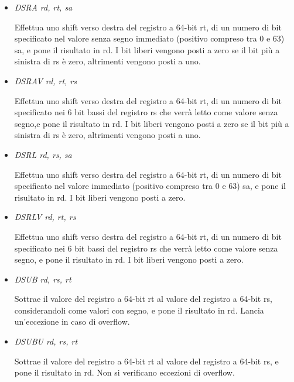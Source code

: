 \documentclass[letterpaper,10pt,english]{sphinxmanual}
\begin{document}
\begin{itemize}
\item {} 
\emph{DSRA rd, rt, sa}

Effettua uno shift verso destra del registro a 64-bit rt, di un numero di
bit specificato nel valore senza segno immediato (positivo compreso tra 0 e
63) sa, e pone il risultato in rd. I bit liberi vengono posti a zero se il
bit più a sinistra di rs è zero, altrimenti vengono posti a uno.

\item {} 
\emph{DSRAV rd, rt, rs}

Effettua uno shift verso destra del registro a 64-bit rt, di un numero di
bit specificato nei 6 bit bassi del registro rs che verrà letto come valore
senza segno,e pone il risultato in rd.  I bit liberi vengono posti a zero se
il bit più a sinistra di rs è zero, altrimenti vengono posti a uno.

\item {} 
\emph{DSRL rd, rs, sa}

Effettua uno shift verso destra del registro a 64-bit rt, di un numero di
bit specificato nel valore immediato (positivo compreso tra 0 e 63) sa, e
pone il risultato in rd. I bit liberi vengono posti a zero.

\item {} 
\emph{DSRLV rd, rt, rs}

Effettua uno shift verso destra del registro a 64-bit rt, di un numero di
bit specificato nei 6 bit bassi del registro rs che verrà letto come valore
senza segno, e pone il risultato in rd. I bit liberi vengono posti a zero.

\item {} 
\emph{DSUB rd, rs, rt}

Sottrae il valore del registro a 64-bit rt al valore del registro a 64-bit
rs, considerandoli come valori con segno, e pone il risultato in rd. Lancia
un'eccezione in caso di overflow.

\item {} 
\emph{DSUBU rd, rs, rt}

Sottrae il valore del registro a 64-bit rt al valore del registro a 64-bit
rs, e pone il risultato in rd.  Non si verificano eccezioni di overflow.

\end{itemize}
\end{document}
